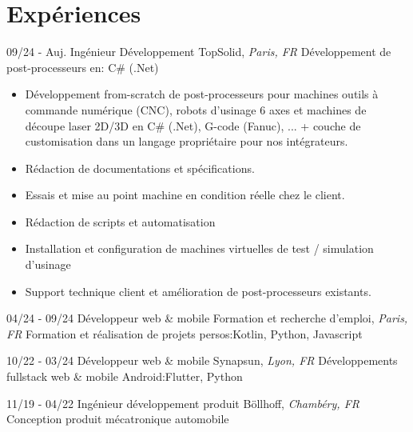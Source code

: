 \documentclass[]{friggeri-cv}
\begin{document}
\section{Expériences}
\vspace*{-0.25cm}

\begin{entrylist}
  \entry
    {09/24 - Auj.}
    {Ingénieur Développement}
    {TopSolid, \textit{Paris, FR}}
    {Développement de post-processeurs en:  C\# (.Net)}
\end{entrylist}
\vspace{-15pt}

\vspace{0.5mm}
\begin{itemize}
\setlength{\itemsep}{1pt}
\setlength{\parskip}{0pt}
\setlength{\parsep}{0pt}

\item Développement from-scratch de post-processeurs pour machines outils à commande numérique (CNC), robots d'usinage 6 axes et machines de découpe laser 2D/3D en C\# (.Net), G-code (Fanuc), ... + couche de customisation dans un langage propriétaire pour nos intégrateurs.
\item Rédaction de documentations et spécifications.
\item Essais et mise au point machine en condition réelle chez le client.
\item Rédaction de scripts et automatisation
\item Installation et configuration de machines virtuelles de test / simulation d'usinage
\item Support technique client et amélioration de post-processeurs existants.
\end{itemize}

\begin{entrylist}
  \entry
    {04/24 - 09/24}
    {Développeur web \& mobile}
    {Formation et recherche d'emploi, \textit{Paris, FR}}
    {Formation et réalisation de projets persos:\hspace*{8mm}Kotlin, Python, Javascript}
\end{entrylist}

\begin{entrylist}
  \entry
    {10/22 - 03/24}
    {Développeur web \& mobile}
    {Synapsun, \textit{Lyon, FR}}
    {Développements fullstack web \& mobile Android:\hspace*{8mm}Flutter, Python}
\end{entrylist}

\begin{entrylist}
  \entry
    {11/19 - 04/22}
    {Ingénieur développement produit}
    {Böllhoff, \textit{Chambéry, FR}}
    {Conception produit mécatronique automobile}
\end{entrylist}
\end{document}

